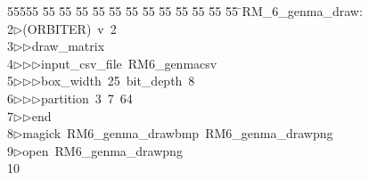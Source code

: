 %
%
\begin{tabbing}
55555 \= 55 \= 55 \= 55 \= 55 \= 55 \= 55 \= 55 \= 55 \= 55 \= 55 \= 55 \= 55 \= \>RM\_6\_genma\_draw:\\[0pt]
2\>$\triangleright$\>(ORBITER)\ v\ 2\ \\[0pt]
3\>$\triangleright$\>$\triangleright$\>draw\_matrix\ \\[0pt]
4\>$\triangleright$\>$\triangleright$\>$\triangleright$\>input\_csv\_file\ RM6\_genmacsv\ \\[0pt]
5\>$\triangleright$\>$\triangleright$\>$\triangleright$\>box\_width\ 25\ bit\_depth\ 8\ \\[0pt]
6\>$\triangleright$\>$\triangleright$\>$\triangleright$\>partition\ 3\ 7\ 64\ \\[0pt]
7\>$\triangleright$\>$\triangleright$\>end\\[0pt]
8\>$\triangleright$\>magick\ RM6\_genma\_drawbmp\ RM6\_genma\_drawpng\\[0pt]
9\>$\triangleright$\>open\ RM6\_genma\_drawpng\\[0pt]
10\>\end{tabbing}
